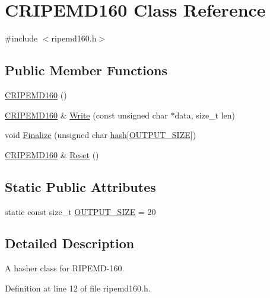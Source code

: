 \hypertarget{class_c_r_i_p_e_m_d160}{}\section{C\+R\+I\+P\+E\+M\+D160 Class Reference}
\label{class_c_r_i_p_e_m_d160}


{\ttfamily \#include $<$ripemd160.\+h$>$}

\subsection*{Public Member Functions}
\begin{DoxyCompactItemize}
\item 
\hyperlink{class_c_r_i_p_e_m_d160_a46cc36b8f1466c2525c51b8036f8eb78}{C\+R\+I\+P\+E\+M\+D160} ()
\item 
\hyperlink{class_c_r_i_p_e_m_d160}{C\+R\+I\+P\+E\+M\+D160} \& \hyperlink{class_c_r_i_p_e_m_d160_a221143b9d94af623d07c4f4ba1bf6007}{Write} (const unsigned char $\ast$data, size\+\_\+t len)
\item 
void \hyperlink{class_c_r_i_p_e_m_d160_a2a11566fbf9d1339b819833313fc4e51}{Finalize} (unsigned char \hyperlink{cache_8cc_a11ecb029164e055f28f4123ce3748862}{hash}\mbox{[}\hyperlink{class_c_r_i_p_e_m_d160_aa43ca990046f81de5473975e5ef71922}{O\+U\+T\+P\+U\+T\+\_\+\+S\+I\+Z\+E}\mbox{]})
\item 
\hyperlink{class_c_r_i_p_e_m_d160}{C\+R\+I\+P\+E\+M\+D160} \& \hyperlink{class_c_r_i_p_e_m_d160_ac096d8ee1b21500f1b6173c44896107b}{Reset} ()
\end{DoxyCompactItemize}
\subsection*{Static Public Attributes}
\begin{DoxyCompactItemize}
\item 
static const size\+\_\+t \hyperlink{class_c_r_i_p_e_m_d160_aa43ca990046f81de5473975e5ef71922}{O\+U\+T\+P\+U\+T\+\_\+\+S\+I\+Z\+E} = 20
\end{DoxyCompactItemize}


\subsection{Detailed Description}
A hasher class for R\+I\+P\+E\+M\+D-\/160. 

Definition at line 12 of file ripemd160.\+h.



